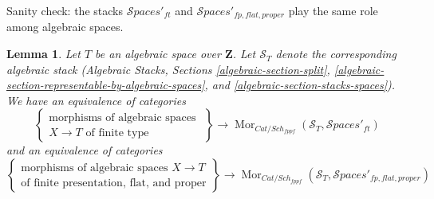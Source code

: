 \documentclass{stacks-project}
\theoremstyle{plain}
\newtheorem{lemma}[subsection]{Lemma}
\theoremstyle{definition}
\theoremstyle{remark}
\numberwithin{equation}{subsection}
\def\Sch{\mathit{Sch}}
\def\Mor{\mathop{\mathrm{Mor}}\nolimits}
\def\Spacesstack{\mathcal{S}\!\mathit{paces}}
\begin{document}
\noindent
Sanity check: the stacks $\Spacesstack'_{ft}$ and
$\Spacesstack'_{fp, flat, proper}$
play the same role among algebraic spaces.

\begin{lemma}
\label{lemma-extend-spaces-to-spaces}
Let $T$ be an algebraic space over $\mathbf{Z}$. Let $\mathcal{S}_T$
denote the corresponding algebraic stack (Algebraic Stacks, Sections
\ref{algebraic-section-split},
\ref{algebraic-section-representable-by-algebraic-spaces}, and
\ref{algebraic-section-stacks-spaces}).
We have an equivalence of categories
$$
\left\{
\begin{matrix}
\text{morphisms of algebraic spaces }\\
X \to T\text{ of finite type}
\end{matrix}
\right\}
\longrightarrow
\Mor_{\textit{Cat}/\Sch_{fppf}}(\mathcal{S}_T, \Spacesstack'_{ft})
$$
and an equivalence of categories
$$
\left\{
\begin{matrix}
\text{morphisms of algebraic spaces }X \to T\\
\text{of finite presentation, flat, and proper}
\end{matrix}
\right\}
\longrightarrow
\Mor_{\textit{Cat}/\Sch_{fppf}}(\mathcal{S}_T,
\Spacesstack'_{fp, flat, proper})
$$
\end{lemma}
\end{document}
